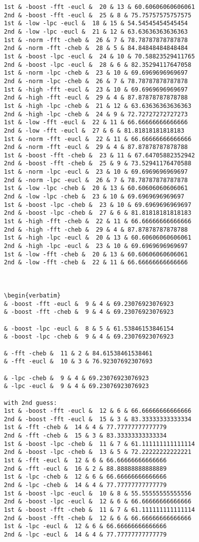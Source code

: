 \begin{verbatim}
1st & -boost -fft -eucl &  20 & 13 & 60.60606060606061
2nd & -boost -fft -eucl &  25 & 8 & 75.75757575757575
1st & -low -lpc -eucl &  18 & 15 & 54.54545454545454
2nd & -low -lpc -eucl &  21 & 12 & 63.63636363636363
1st & -norm -fft -cheb &  26 & 7 & 78.78787878787878
2nd & -norm -fft -cheb &  28 & 5 & 84.84848484848484
1st & -boost -lpc -eucl &  24 & 10 & 70.58823529411765
2nd & -boost -lpc -eucl &  28 & 6 & 82.35294117647058
1st & -norm -lpc -cheb &  23 & 10 & 69.6969696969697
2nd & -norm -lpc -cheb &  26 & 7 & 78.78787878787878
1st & -high -fft -eucl &  23 & 10 & 69.6969696969697
2nd & -high -fft -eucl &  29 & 4 & 87.87878787878788
1st & -high -lpc -cheb &  21 & 12 & 63.63636363636363
2nd & -high -lpc -cheb &  24 & 9 & 72.72727272727273
1st & -low -fft -eucl &  22 & 11 & 66.66666666666666
2nd & -low -fft -eucl &  27 & 6 & 81.81818181818183
1st & -norm -fft -eucl &  22 & 11 & 66.66666666666666
2nd & -norm -fft -eucl &  29 & 4 & 87.87878787878788
1st & -boost -fft -cheb &  23 & 11 & 67.64705882352942
2nd & -boost -fft -cheb &  25 & 9 & 73.52941176470588
1st & -norm -lpc -eucl &  23 & 10 & 69.6969696969697
2nd & -norm -lpc -eucl &  26 & 7 & 78.78787878787878
1st & -low -lpc -cheb &  20 & 13 & 60.60606060606061
2nd & -low -lpc -cheb &  23 & 10 & 69.6969696969697
1st & -boost -lpc -cheb &  23 & 10 & 69.6969696969697
2nd & -boost -lpc -cheb &  27 & 6 & 81.81818181818183
1st & -high -fft -cheb &  22 & 11 & 66.66666666666666
2nd & -high -fft -cheb &  29 & 4 & 87.87878787878788
1st & -high -lpc -eucl &  20 & 13 & 60.60606060606061
2nd & -high -lpc -eucl &  23 & 10 & 69.6969696969697
1st & -low -fft -cheb &  20 & 13 & 60.60606060606061
2nd & -low -fft -cheb &  22 & 11 & 66.66666666666666



\begin{verbatim}
& -boost -fft -eucl &  9 & 4 & 69.23076923076923
& -boost -fft -cheb &  9 & 4 & 69.23076923076923

& -boost -lpc -eucl &  8 & 5 & 61.53846153846154
& -boost -lpc -cheb &  9 & 4 & 69.23076923076923

& -fft -cheb &  11 & 2 & 84.61538461538461
& -fft -eucl &  10 & 3 & 76.92307692307693

& -lpc -cheb &  9 & 4 & 69.23076923076923
& -lpc -eucl &  9 & 4 & 69.23076923076923

with 2nd guess:
1st & -boost -fft -eucl &  12 & 6 & 66.66666666666666
2nd & -boost -fft -eucl &  15 & 3 & 83.33333333333334
1st & -fft -cheb &  14 & 4 & 77.77777777777779
2nd & -fft -cheb &  15 & 3 & 83.33333333333334
1st & -boost -lpc -cheb &  11 & 7 & 61.111111111111114
2nd & -boost -lpc -cheb &  13 & 5 & 72.22222222222221
1st & -fft -eucl &  12 & 6 & 66.66666666666666
2nd & -fft -eucl &  16 & 2 & 88.88888888888889
1st & -lpc -cheb &  12 & 6 & 66.66666666666666
2nd & -lpc -cheb &  14 & 4 & 77.77777777777779
1st & -boost -lpc -eucl &  10 & 8 & 55.55555555555556
2nd & -boost -lpc -eucl &  12 & 6 & 66.66666666666666
1st & -boost -fft -cheb &  11 & 7 & 61.111111111111114
2nd & -boost -fft -cheb &  12 & 6 & 66.66666666666666
1st & -lpc -eucl &  12 & 6 & 66.66666666666666
2nd & -lpc -eucl &  14 & 4 & 77.77777777777779



\end{verbatim}
